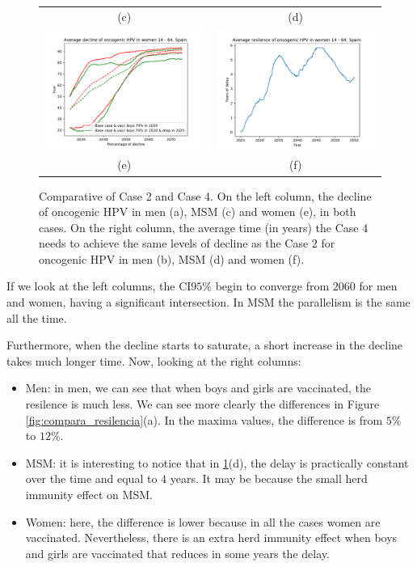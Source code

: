 \begin{figure}[!]
\begin{tabular}{cc}
		(c)	& (d) \\
		\includegraphics[width=0.5\linewidth]{IMGs/11.-Resilencia/2_y_4/decline_onco_muj.pdf}	& 
		\includegraphics[width=0.5\linewidth]{IMGs/11.-Resilencia/2_y_4/resilencia_onco_muj.pdf}  \\ 
		(e)	& (f) \\  
	\end{tabular} 
	\caption{Comparative of Case 2 and Case 4. On the left column, the decline of oncogenic HPV in men (a), MSM (c) and women (e), in both cases. On the right column, the average time (in years) the Case 4 needs to achieve the same levels of decline as the Case 2 for oncogenic HPV in men (b), MSM (d) and women (f).}
	\label{fig:Case2_Case4}
\end{figure}

If we look at the left columns, the CI$95\%$ begin to converge from $2060$ for men and women, having a significant intersection. In MSM the parallelism is the same all the time.

Furthermore, when the decline starts to saturate, a short increase in the decline takes much longer time. Now, looking at the right columns:

\begin{itemize}
\item Men: in men, we can see that when boys and girls are vaccinated, the resilence is much less. We can see more clearly the differences in Figure \ref{fig:compara_resilencia}(a). In the maxima values, the difference is from $5\%$ to $12\%$.
\item MSM: it is interesting to notice that in \ref{fig:Case2_Case4}(d), the delay is practically constant over the time and equal to $4$ years. It may be because the small herd immunity effect on MSM.
\item Women: here, the difference is lower because in all the cases women are vaccinated. Nevertheless, there is an extra herd immunity effect when boys and girls are vaccinated that reduces in some years the delay.
\end{itemize}


